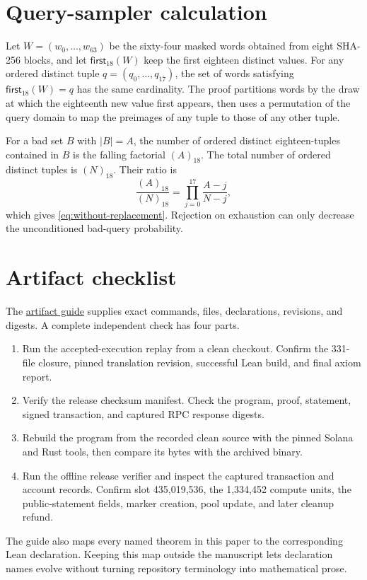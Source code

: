 \section{Query-sampler calculation}
\label{app:query-calculation}

Let \(W=(w_0,\ldots,w_{63})\) be the sixty-four masked words obtained from
eight SHA-256 blocks, and let \(\mathsf{first}_{18}(W)\) keep the first
eighteen distinct values.  For any ordered distinct tuple
\(q=(q_0,\ldots,q_{17})\), the set of words satisfying
\(\mathsf{first}_{18}(W)=q\) has the same cardinality.  The proof partitions
words by the draw at which the eighteenth new value first appears, then uses a
permutation of the query domain to map the preimages of any tuple to those of
any other tuple.

For a bad set \(B\) with \(|B|=A\), the number of ordered distinct
eighteen-tuples contained in \(B\) is the falling factorial
\((A)_{18}\).  The total number of ordered distinct tuples is
\((N)_{18}\).  Their ratio is
\[
  \frac{(A)_{18}}{(N)_{18}}
  =\prod_{j=0}^{17}\frac{A-j}{N-j},
\]
which gives \cref{eq:without-replacement}.  Rejection on exhaustion can only
decrease the unconditioned bad-query probability.

\section{Artifact checklist}
\label{app:artifact-checklist}

The
\href{https://github.com/DJBarker87/aspisZK/blob/aspis-v5-formalization-paper-v1/paper/aspis-formalization/ARTIFACT.md}
{artifact guide} supplies exact commands, files, declarations, revisions, and
digests.  A complete independent check has four parts.

\begin{enumerate}[leftmargin=*]
  \item Run the accepted-execution replay from a clean checkout.  Confirm the
        331-file closure, pinned translation revision, successful Lean build,
        and final axiom report.
  \item Verify the release checksum manifest.  Check the program, proof,
        statement, signed transaction, and captured RPC response digests.
  \item Rebuild the program from the recorded clean source with the pinned
        Solana and Rust tools, then compare its bytes with the archived binary.
  \item Run the offline release verifier and inspect the captured transaction
        and account records.  Confirm slot 435,019,536, the 1,334,452 compute
        units, the public-statement fields, marker creation, pool update, and
        later cleanup refund.
\end{enumerate}

The guide also maps every named theorem in this paper to the corresponding
Lean declaration.  Keeping this map outside the manuscript lets declaration
names evolve without turning repository terminology into mathematical prose.
